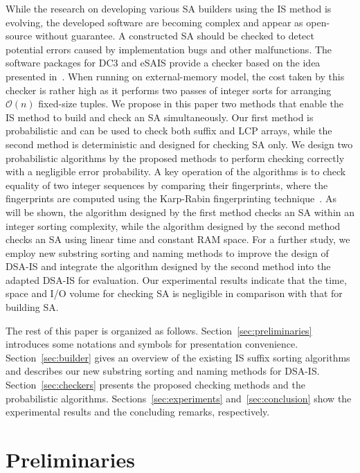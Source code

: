 \documentclass[10pt,journal,compsoc]{IEEEtran}
\begin{document}
While the research on developing various SA builders using the IS method is evolving, the developed software are becoming complex and appear as open-source without guarantee. 
A constructed SA should be checked to detect potential errors caused by implementation bugs and other malfunctions. 
The software packages for DC3 and eSAIS provide a checker based on the idea presented in~\cite{Dementiev2008a}. 
When running on external-memory model, the cost taken by this checker is rather high as it performs two passes of integer sorts for arranging $\mathcal{O}(n)$ fixed-size tuples. 
We propose in this paper two methods that enable the IS method to build and check an SA simultaneously. 
Our first method is probabilistic and can be used to check both suffix and LCP arrays, while the second method is deterministic and designed for checking SA only. 
We design two probabilistic algorithms by the proposed methods to perform checking correctly with a negligible error probability. A key operation of the algorithms is to check equality of two integer sequences by comparing their fingerprints, where the fingerprints are computed using the Karp-Rabin fingerprinting technique~\cite{Karp1987}. As will be shown, the algorithm designed by the first method checks an SA within an integer sorting complexity, while the algorithm designed by the second method checks an SA using linear time and constant RAM space. For a further study, we employ new substring sorting and naming methods to improve the design of DSA-IS and integrate the algorithm designed by the second method into the adapted DSA-IS for evaluation. Our experimental results indicate that the time, space and I/O volume for checking SA is negligible in comparison with that for building SA.

The rest of this paper is organized as follows. Section~\ref{sec:preliminaries} introduces some notations and symbols for presentation convenience. Section~\ref{sec:builder} gives an overview of the existing IS suffix sorting algorithms and describes our new substring sorting and naming methods for DSA-IS. Section~\ref{sec:checkers} presents the proposed checking methods and the probabilistic algorithms. Sections~\ref{sec:experiments} and~\ref{sec:conclusion} show the experimental results and the concluding remarks, respectively.

\section{Preliminaries}~\label{sec:preliminaries}
\end{document}
